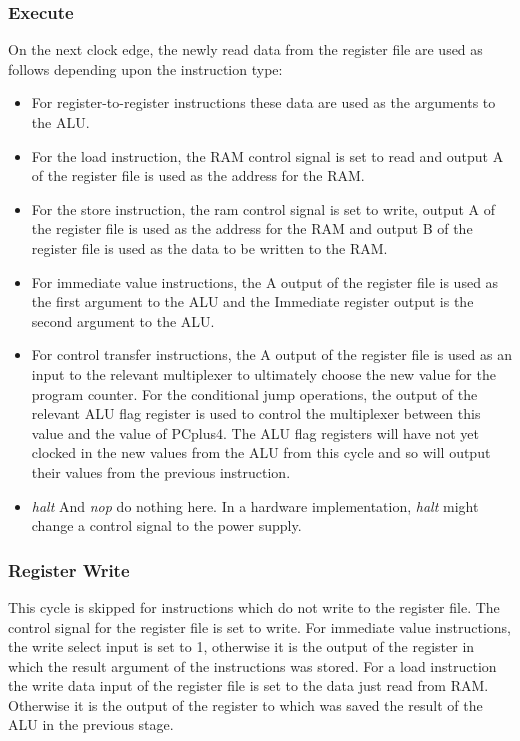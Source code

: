 \documentclass[11pt,a4paper]{IEEEtran}
\begin{document}
			\subsubsection{Execute}
				On the next clock edge, the newly read data from the register file are used as follows depending upon the instruction type:

				\begin{itemize}
					\item For register-to-register instructions these data are used as the arguments to the ALU.
					\item For the load instruction, the RAM control signal is set to read and output A of the register file is used as the address for the RAM.
					\item For the store instruction, the ram control signal is set to write, output A of the register file is used as the address for the RAM and output B of the register file is used as the data to be written to the RAM.
					\item For immediate value instructions, the A output of the register file is used as the first argument to the ALU and the Immediate register output is the second argument to the ALU. 
					\item For control transfer instructions, the A output of the register file is used as an input to the relevant multiplexer to ultimately choose the new value for the program counter. For the conditional jump operations, the output of the relevant ALU flag register is used to control the multiplexer between this value and the value of PCplus4. The ALU flag registers will have not yet clocked in the new values from the ALU from this cycle and so will output their values from the previous instruction. 
					\item \textit{halt} And \textit{nop} do nothing here. In a hardware implementation, \textit{halt} might change a control signal to the power supply. 
				\end{itemize}								
				 
			\subsubsection{Register Write}
				This cycle is skipped for instructions which do not write to the register file. The control signal for the register file is set to write. For immediate value instructions, the write select input is set to 1, otherwise it is the output of the register in which the result argument of the instructions was stored. For a load instruction the write data input of the register file is set to the data just read from RAM. Otherwise it is the output of the register to which was saved the result of the ALU in the previous stage.			
			
\end{document}
